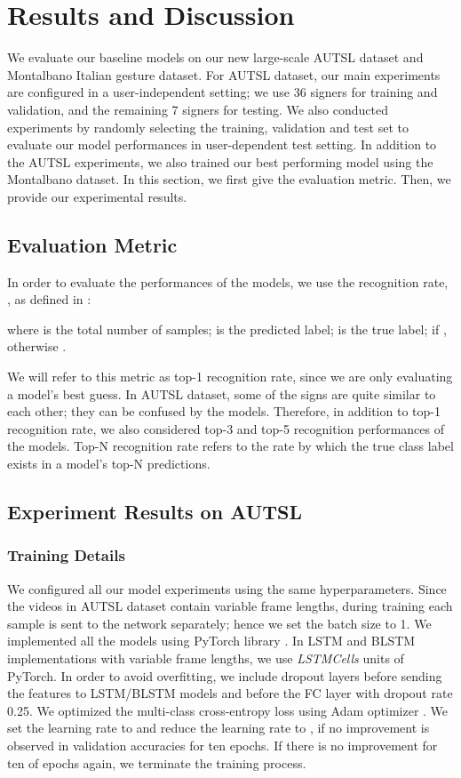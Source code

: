 \documentclass[11pt, a4paper, singlecolumn]{article}
\begin{document}
\section{Results and Discussion}
\label{sec:experimentsResults}
We evaluate our baseline models on our new large-scale AUTSL dataset and Montalbano Italian gesture dataset. For AUTSL dataset, our main experiments are configured in a user-independent setting; we use 36 signers for training and validation, and the remaining 7 signers for testing.  We also conducted experiments by randomly selecting the training, validation and test set to evaluate our model performances in user-dependent test setting. In addition to the AUTSL experiments, we also trained our best performing model using the Montalbano dataset. In this section, we first give the evaluation metric. Then, we provide our experimental results.

\subsection{Evaluation Metric}
\label{sec:evaluationMetric}
In order to evaluate the performances of the models, we use the recognition rate, , as defined in  \cite{wan2016chalearn}:


where  is the total number of samples;  is the predicted label;  is the true label; if , otherwise .

We will refer to this metric as top-1 recognition rate, since we are only evaluating a model’s best guess. In AUTSL dataset, some of the signs are quite similar to each other; they can be confused by the models. Therefore, in addition to top-1 recognition rate, we also considered top-3 and top-5 recognition performances of the models. Top-N recognition rate refers to the rate by which the true class label exists in a model’s top-N predictions.

\subsection{Experiment Results on AUTSL}

\subsubsection{Training Details}
\label{sec:trainingDetails}
We configured all our model experiments using the same hyperparameters. Since the videos in AUTSL dataset contain variable frame lengths, during training each sample is sent to the network separately; hence we set the batch size to 1. We implemented all the models using PyTorch library \cite{paszke2019pytorch}. In LSTM and BLSTM implementations with variable frame lengths, we use \textit{LSTMCells} units of PyTorch. In order to avoid overfitting, we include dropout layers before sending the features to LSTM/BLSTM models and before the FC layer with dropout rate 0.25. We optimized the multi-class cross-entropy loss using Adam optimizer \cite{konur2015adam}. We set the learning rate to  and reduce the learning rate to , if no improvement is observed in validation accuracies for ten epochs. If there is no improvement for ten of epochs again, we terminate the training process.
\end{document}
